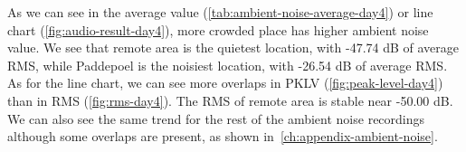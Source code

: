 	As we can see in the average value (\autoref{tab:ambient-noise-average-day4}) or line chart (\autoref{fig:audio-result-day4}), more crowded place has higher ambient noise value. We see that remote area is the quietest location, with -47.74 dB of average \ac{RMS}, while Paddepoel is the noisiest location, with -26.54 dB of average \ac{RMS}. As for the line chart, we can see more overlaps in \ac{PKLV} (\autoref{fig:peak-level-day4}) than in \ac{RMS} (\autoref{fig:rms-day4}). The \ac{RMS} of remote area is stable near -50.00 dB. We can also see the same trend for the rest of the ambient noise recordings although some overlaps are present, as shown in~\autoref{ch:appendix-ambient-noise}.






